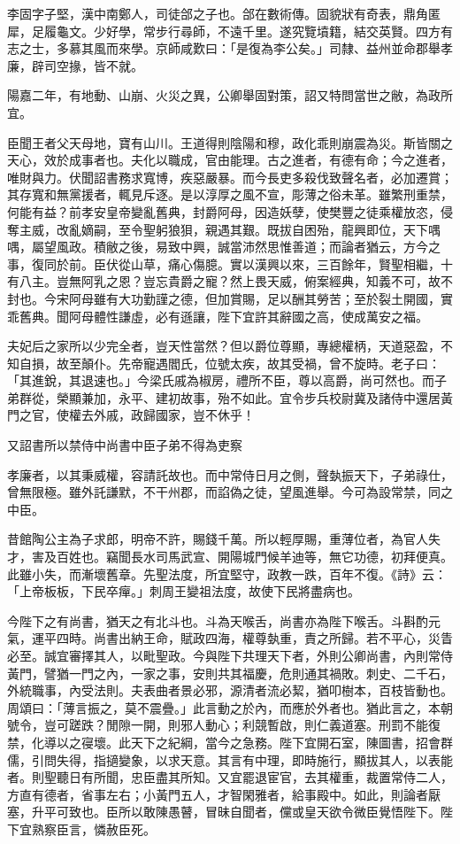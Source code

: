 
\begin{pinyinscope}
李固字子堅，漢中南鄭人，司徒郃之子也。郃在數術傳。固貌狀有奇表，鼎角匿犀，足履龜文。少好學，常步行尋師，不遠千里。遂究覽墳籍，結交英賢。四方有志之士，多慕其風而來學。京師咸歎曰：「是復為李公矣。」司隸、益州並命郡舉孝廉，辟司空掾，皆不就。

陽嘉二年，有地動、山崩、火災之異，公卿舉固對策，詔又特問當世之敝，為政所宜。

臣聞王者父天母地，寶有山川。王道得則陰陽和穆，政化乖則崩震為災。斯皆關之天心，效於成事者也。夫化以職成，官由能理。古之進者，有德有命；今之進者，唯財與力。伏聞詔書務求寬博，疾惡嚴暴。而今長吏多殺伐致聲名者，必加遷賞；其存寬和無黨援者，輒見斥逐。是以淳厚之風不宣，彫薄之俗未革。雖繁刑重禁，何能有益？前孝安皇帝變亂舊典，封爵阿母，因造妖孽，使樊豐之徒乘權放恣，侵奪主威，改亂嫡嗣，至令聖躬狼狽，親遇其艱。既拔自困殆，龍興即位，天下喁喁，屬望風政。積敝之後，易致中興，誠當沛然思惟善道；而論者猶云，方今之事，復同於前。臣伏從山草，痛心傷臆。實以漢興以來，三百餘年，賢聖相繼，十有八主。豈無阿乳之恩？豈忘貴爵之寵？然上畏天威，俯案經典，知義不可，故不封也。今宋阿母雖有大功勤謹之德，但加賞賜，足以酬其勞苦；至於裂土開國，實乖舊典。聞阿母體性謙虛，必有遜讓，陛下宜許其辭國之高，使成萬安之福。

夫妃后之家所以少完全者，豈天性當然？但以爵位尊顯，專總權柄，天道惡盈，不知自損，故至顛仆。先帝寵遇閻氏，位號太疾，故其受禍，曾不旋時。老子曰：「其進銳，其退速也。」今梁氏戚為椒房，禮所不臣，尊以高爵，尚可然也。而子弟群從，榮顯兼加，永平、建初故事，殆不如此。宜令步兵校尉冀及諸侍中還居黃門之官，使權去外戚，政歸國家，豈不休乎！

又詔書所以禁侍中尚書中臣子弟不得為吏察

孝廉者，以其秉威權，容請託故也。而中常侍日月之側，聲埶振天下，子弟祿仕，曾無限極。雖外託謙默，不干州郡，而諂偽之徒，望風進舉。今可為設常禁，同之中臣。

昔館陶公主為子求郎，明帝不許，賜錢千萬。所以輕厚賜，重薄位者，為官人失才，害及百姓也。竊聞長水司馬武宣、開陽城門候羊迪等，無它功德，初拜便真。此雖小失，而漸壞舊章。先聖法度，所宜堅守，政教一跌，百年不復。《詩》云：「上帝板板，下民卒癉。」刺周王變祖法度，故使下民將盡病也。

今陛下之有尚書，猶天之有北斗也。斗為天喉舌，尚書亦為陛下喉舌。斗斟酌元氣，運平四時。尚書出納王命，賦政四海，權尊埶重，責之所歸。若不平心，災眚必至。誠宜審擇其人，以毗聖政。今與陛下共理天下者，外則公卿尚書，內則常侍黃門，譬猶一門之內，一家之事，安則共其福慶，危則通其禍敗。刺史、二千石，外統職事，內受法則。夫表曲者景必邪，源清者流必絜，猶叩樹本，百枝皆動也。周頌曰：「薄言振之，莫不震疊。」此言動之於內，而應於外者也。猶此言之，本朝號令，豈可蹉跌？閒隙一開，則邪人動心；利競暫啟，則仁義道塞。刑罰不能復禁，化導以之寑壞。此天下之紀綱，當今之急務。陛下宜開石室，陳圖書，招會群儒，引問失得，指擿變象，以求天意。其言有中理，即時施行，顯拔其人，以表能者。則聖聽日有所聞，忠臣盡其所知。又宜罷退宦官，去其權重，裁置常侍二人，方直有德者，省事左右；小黃門五人，才智閑雅者，給事殿中。如此，則論者厭塞，升平可致也。臣所以敢陳愚瞽，冒昧自聞者，儻或皇天欲令微臣覺悟陛下。陛下宜熟察臣言，憐赦臣死。


\end{pinyinscope}
